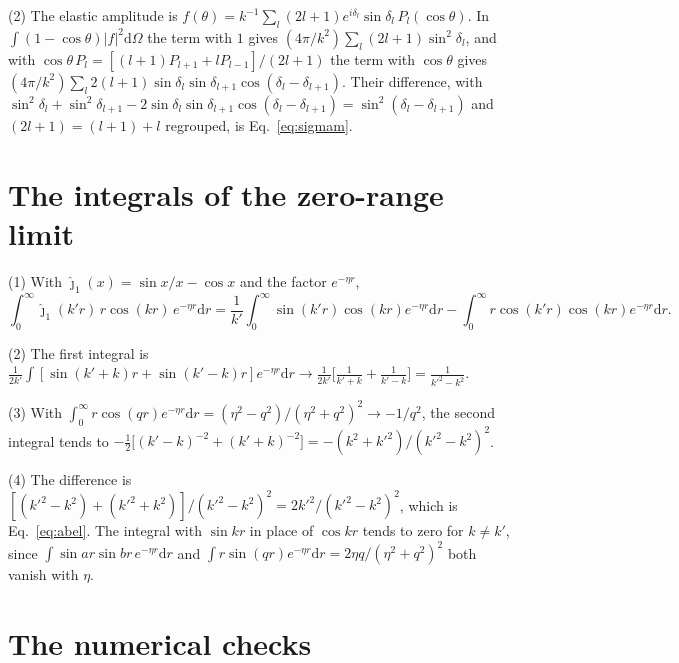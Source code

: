 \documentclass[11pt]{article}
\numberwithin{equation}{section}
\newcommand{\dd}{\mathrm d}
\begin{document}
{\noindent}(2) The elastic amplitude is
$f(\theta)=k^{-1}\sum_l(2l+1)e^{i\delta_l}\sin\delta_l\,P_l(\cos\theta)$.
In $\int(1-\cos\theta)|f|^2\dd\Omega$ the term with $1$ gives
$(4\pi/k^2)\sum_l(2l+1)\sin^2\delta_l$, and with
$\cos\theta\,P_l=[(l+1)P_{l+1}+lP_{l-1}]/(2l+1)$ the term with $\cos\theta$
gives $(4\pi/k^2)\sum_l2(l+1)\sin\delta_l\sin\delta_{l+1}\cos(\delta_l-\delta_{l+1})$.
Their difference, with
$\sin^2\delta_l+\sin^2\delta_{l+1}-2\sin\delta_l\sin\delta_{l+1}\cos(\delta_l-\delta_{l+1})
=\sin^2(\delta_l-\delta_{l+1})$ and $(2l+1)=(l+1)+l$ regrouped, is
Eq.~\eqref{eq:sigmam}.

\section{The integrals of the zero-range limit}
\label{app:abel}

{\noindent}(1) With $\hat\jmath_1(x)=\sin x/x-\cos x$ and the factor
$e^{-\eta r}$,
\begin{equation}
\int_0^\infty\hat\jmath_1(k'r)\,r\cos(kr)\,e^{-\eta r}\dd r
=\frac1{k'}\int_0^\infty\sin(k'r)\cos(kr)e^{-\eta r}\dd r
-\int_0^\infty r\cos(k'r)\cos(kr)e^{-\eta r}\dd r .
\end{equation}

{\noindent}(2) The first integral is
$\frac1{2k'}\int[\sin(k'+k)r+\sin(k'-k)r]e^{-\eta r}\dd r\to
\frac1{2k'}\big[\frac1{k'+k}+\frac1{k'-k}\big]=\frac{1}{k'^2-k^2}$.

{\noindent}(3) With $\int_0^\infty r\cos(qr)e^{-\eta r}\dd r
=(\eta^2-q^2)/(\eta^2+q^2)^2\to-1/q^2$, the second integral tends to
$-\frac12\big[(k'-k)^{-2}+(k'+k)^{-2}\big]=-(k^2+k'^2)/(k'^2-k^2)^2$.

{\noindent}(4) The difference is
$[(k'^2-k^2)+(k'^2+k^2)]/(k'^2-k^2)^2=2k'^2/(k'^2-k^2)^2$, which is
Eq.~\eqref{eq:abel}. The integral with $\sin kr$ in place of $\cos kr$ tends
to zero for $k\ne k'$, since $\int\sin a r\sin b r\,e^{-\eta r}\dd r$ and
$\int r\sin(qr)e^{-\eta r}\dd r=2\eta q/(\eta^2+q^2)^2$ both vanish with $\eta$.

\section{The numerical checks}
\label{app:checks}
\end{document}
